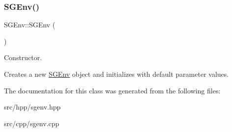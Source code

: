 \subsubsection{\texorpdfstring{S\+G\+Env()}{SGEnv()}}
{\footnotesize\ttfamily S\+G\+Env\+::\+S\+G\+Env (\begin{DoxyParamCaption}{ }\end{DoxyParamCaption})}



Constructor. 

Creates a new \hyperlink{classSGEnv}{S\+G\+Env} object and initializes with default parameter values. 

The documentation for this class was generated from the following files\+:\begin{DoxyCompactItemize}
\item 
src/hpp/sgenv.\+hpp\item 
src/cpp/sgenv.\+cpp\end{DoxyCompactItemize}
